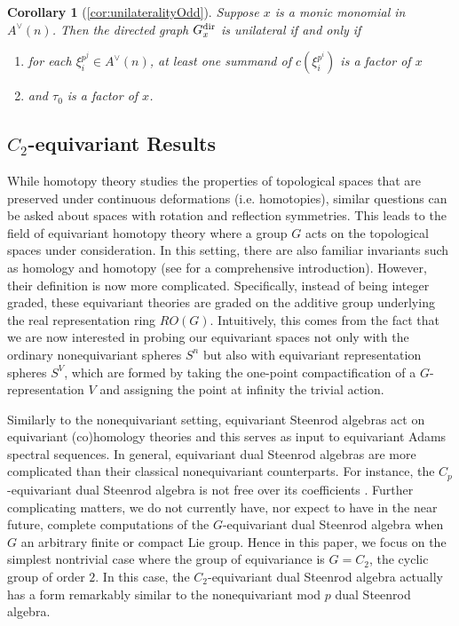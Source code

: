 \documentclass{amsart}
\newtheorem*{cor*}{Corollary}
\theoremstyle{definition}
\theoremstyle{plain}
\numberwithin{theorem}{section}
\numberwithin{equation}{section}
\numberwithin{figure}{section}
\newcommand{\0}{\langle 0 \rangle }
\begin{document}
\begin{cor*}[\cref{cor:unilateralityOdd}]
    Suppose $x$ is a monic monomial in $A^\vee (n)$. Then the directed graph $G_x^{\textup{dir}}$ is unilateral if and only if
    \begin{enumerate}
        \item for each $\xi_i^{p^j} \in A^\vee (n)$, at least one summand of $c(\xi_i^{p^i})$ is a factor of $x$
        \item and $\tau_0$ is a factor of $x$.
    \end{enumerate}
\end{cor*}

\subsection{$C_2$-equivariant Results} 
While homotopy theory studies the properties of topological spaces that are preserved under continuous deformations (i.e. homotopies), similar questions can be asked about spaces with rotation and reflection symmetries. This leads to the field of equivariant homotopy theory where a group $G$ acts on the topological spaces under consideration. In this setting, there are also familiar invariants such as homology and homotopy (see \cite{AlaskaNotes96} for a comprehensive introduction). However, their definition is now more complicated. Specifically, instead of being integer graded, these equivariant theories are graded on the additive group underlying the real representation ring $RO(G)$. Intuitively, this comes from the fact that we are now interested in probing our equivariant spaces not only with the ordinary nonequivariant spheres $S^n$ but also with equivariant representation spheres $S^V$, which are formed by taking the one-point compactification of a $G$-representation $V$ and assigning the point at infinity the trivial action. 

Similarly to the nonequivariant setting, equivariant Steenrod algebras act on equivariant (co)homology theories and this serves as input to equivariant Adams spectral sequences. In general, equivariant dual Steenrod algebras are more complicated than their classical nonequivariant counterparts. For instance, the $C_p$-equivariant dual Steenrod algebra is not free over its coefficients \cite{SankarWilson22,HuKrizSombergZou23}. Further complicating matters, we do not currently have, nor expect to have in the near future, complete computations of the $G$-equivariant dual Steenrod algebra when $G$ an arbitrary finite or compact Lie group. Hence in this paper, we focus on the simplest nontrivial case where the group of equivariance is $G = C_2$, the cyclic group of order $2$. In this case, the $C_2$-equivariant dual Steenrod algebra actually has a form remarkably similar to the nonequivariant mod $p$ dual Steenrod algebra. 
\end{document}
